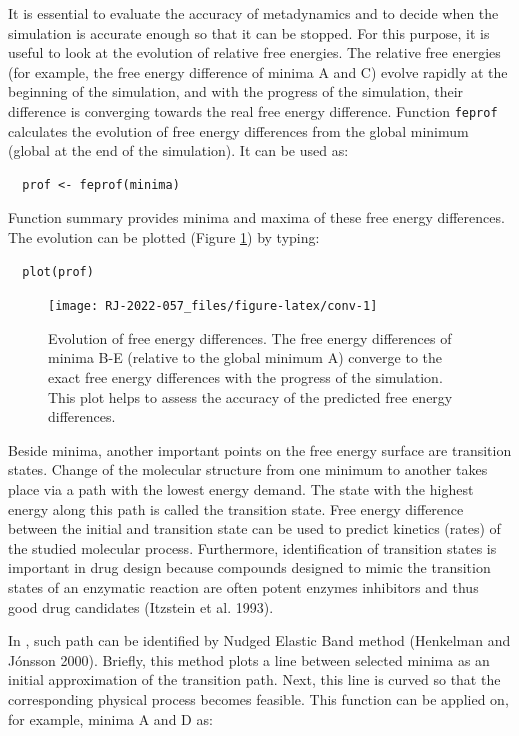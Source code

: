 It is essential to evaluate the accuracy of metadynamics and to decide
when the simulation is accurate enough so that it can be stopped. For this
purpose, it is useful to look at the evolution of relative free energies.
The relative free energies (for example, the free energy difference of minima
A and C) evolve rapidly at the beginning of the simulation, and with the progress
of the simulation, their difference is converging towards the real free energy
difference. Function \texttt{feprof} calculates the evolution of free energy differences
from the global minimum (global at the end of the simulation).
It can be used as:

\begin{verbatim}
  prof <- feprof(minima)
\end{verbatim}

Function summary provides minima and maxima of these free energy differences. The evolution
can be plotted (Figure \ref{fig:conv}) by typing:

\begin{verbatim}
  plot(prof)
\end{verbatim}

\begin{figure}

{\centering \texttt{[image: RJ-2022-057\_files/figure-latex/conv-1]} 

}

\caption{Evolution of free energy differences. The free energy differences of minima B-E (relative to the global minimum A) converge to the exact free energy differences with the progress of the simulation. This plot helps to assess the accuracy of the predicted free energy differences.}\label{fig:conv}
\end{figure}

Beside minima, another important points on the free energy surface are transition
states. Change of the molecular structure from one minimum to
another takes place via a path with the lowest energy demand.
The state with the highest energy along this path is called
the transition state. Free energy difference between the initial
and transition state can be used to predict kinetics (rates)
of the studied molecular process. Furthermore, identification
of transition states is important in drug design because
compounds designed to mimic the transition states of an enzymatic
reaction are often potent enzymes inhibitors and thus good drug
candidates (Itzstein et al. 1993).

In , such path can be identified by Nudged
Elastic Band method (Henkelman and Jónsson 2000). Briefly, this method plots
a line between selected minima as an initial approximation
of the transition path. Next, this line is curved so that the
corresponding physical process becomes feasible. This function
can be applied on, for example, minima A and D as:

